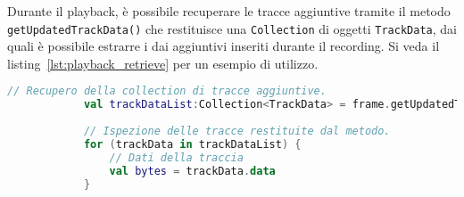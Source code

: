 \documentclass[crop=false, class=book]{standalone}
\begin{document}
	\noindent
	Durante il playback, è possibile recuperare le tracce aggiuntive tramite il metodo \verb|getUpdatedTrackData()| che restituisce una \verb|Collection| di oggetti \verb|TrackData|, dai quali è possibile estrarre i dai aggiuntivi inseriti durante il recording. Si veda il listing~\vref{lst:playback_retrieve} per un esempio di utilizzo.
	\begin{center}
		\begin{minipage}{0.95\textwidth}
			\begin{lstlisting}[caption={Recupero della traccia aggiuntiva durante il playback.}, label={lst:playback_retrieve}, language=Kotlin]
			// Recupero della collection di tracce aggiuntive.
			val trackDataList:Collection<TrackData> = frame.getUpdatedTrackData(trackUUID)
			
			// Ispezione delle tracce restituite dal metodo.
			for (trackData in trackDataList) {
				// Dati della traccia
				val bytes = trackData.data
			}
				
			\end{lstlisting}
		\end{minipage}
	\end{center}
\end{document}
